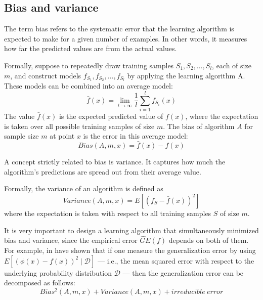         \subsection{Bias and variance}\label{biasvariance}
            The term bias refers to the systematic error that the learning algorithm is expected to make for a given number of examples. In other words, it measures how far the predicted values are from the actual values. 
            
            Formally, suppose to repeatedly draw training samples \(S_{1},S_{2},\dots,S_{l}\), each of size \(m\), and construct models \(f_{S_{1}},f_{S_{2}},\dots,f_{S_{l}}\) by applying the learning algorithm A. These models can be combined into an average model:
            \[\bar{f}\left(x\right) = \lim_{l \rightarrow \infty}\frac{1}{l}\sum_{i=1}^{l}f_{S_{i}}\left(x\right)\]
            The value \(\bar{f}\left(x\right)\) is the expected predicted value of \(f\left(x\right)\), where the expectation is taken over all possible training samples of size \(m\). The bias of algorithm \(A\) for sample size \(m\) at point \(x\) is the error in this average model:
            \[Bias\left(A,m,x\right) = \bar{f}\left(x\right) - f\left(x\right)\]
            
            A concept strictly related to bias is variance. It captures how much the algorithm's predictions are spread out from their average value.
            
            Formally, the variance of an algorithm is defined as
            \[Variance\left(A,m,x\right) = E\left[\left(f_{S} - \bar{f}\left(x\right)\right)^{2}\right]\]
            where the expectation is taken with respect to all training samples \(S\) of size \(m\).
            
            It is very important to design a learning algorithm that simultaneously minimized bias and variance, since the empirical error \(\widehat{GE}\left(f\right)\) depends on both of them. For example, in \cite{Geman} \citeauthor{Geman} have shown that if one measure the generalization error by using \(E\left[\left(\phi\left(x\right) - f\left(x\right)\right)^2 \mid \mathcal{D}\right]\) --- i.e., the mean squared error with respect to the underlying probability distribution \(\mathcal{D}\) --- then the generalization error can be decomposed as follows:
            \[Bias^2\left(A,m,x\right) + Variance\left(A,m,x\right) + irreducible\ error\]
            
